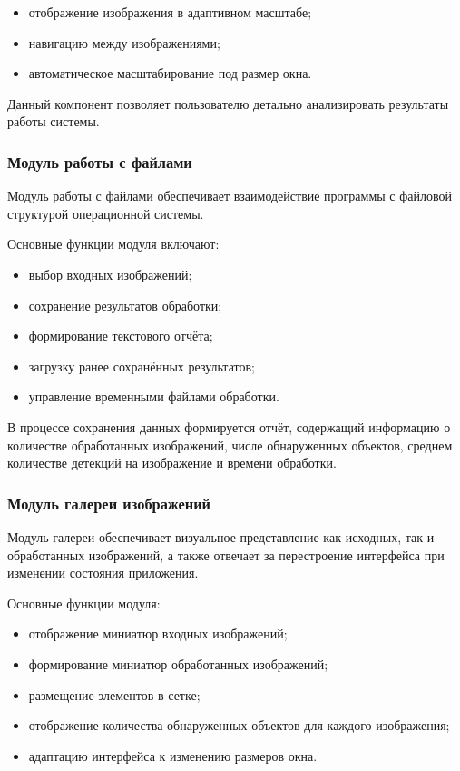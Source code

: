 \begin{itemize}
	\item отображение изображения в адаптивном масштабе;
	\item навигацию между изображениями;
	\item автоматическое масштабирование под размер окна.
\end{itemize}

Данный компонент позволяет пользователю детально анализировать результаты работы системы.


\subsubsection{Модуль работы с файлами}

Модуль работы с файлами обеспечивает взаимодействие программы с файловой структурой операционной системы.

Основные функции модуля включают:

\begin{itemize}
	\item выбор входных изображений;
	\item сохранение результатов обработки;
	\item формирование текстового отчёта;
	\item загрузку ранее сохранённых результатов;
	\item управление временными файлами обработки.
\end{itemize}

В процессе сохранения данных формируется отчёт, содержащий информацию о количестве обработанных изображений, числе обнаруженных объектов, среднем количестве детекций на изображение и времени обработки.

\subsubsection{Модуль галереи изображений}

Модуль галереи обеспечивает визуальное представление как исходных, так и обработанных изображений, а также отвечает за перестроение интерфейса при изменении состояния приложения.

Основные функции модуля:

\begin{itemize}
	\item отображение миниатюр входных изображений;
	\item формирование миниатюр обработанных изображений;
	\item размещение элементов в сетке;
	\item отображение количества обнаруженных объектов для каждого изображения;
	\item адаптацию интерфейса к изменению размеров окна.
\end{itemize}

